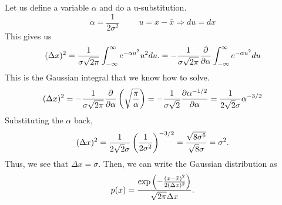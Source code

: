         Let us define a variable $\alpha$ and do a u-substitution.
        \begin{equation}
            \alpha = \frac{1}{2\sigma^2} \hspace{1cm} u=x-\bar{x}\Rightarrow du=dx
        \end{equation}
        This gives us
        \begin{equation}
            (\Delta x)^2 = \frac{1}{\sigma\sqrt{2\pi}}\int_{-\infty}^\infty e^{-\alpha u^2}u^2du. = -\frac{1}{\sigma\sqrt{2\pi}}\frac{\partial }{\partial \alpha}\int_{-\infty}^\infty e^{-\alpha u^2}du
        \end{equation}
        This is the Gaussian integral that we know how to solve. 
        \begin{equation}
            (\Delta x)^2 = -\frac{1}{\sigma\sqrt{2\pi}}\frac{\partial }{\partial \alpha}\left( \sqrt{\frac{\pi}{\alpha}} \right) = -\frac{1}{\sigma\sqrt{2}}\frac{\partial \alpha^{-1/2}}{\partial \alpha} = \frac{1}{2\sqrt{2}\sigma}\alpha^{-3/2}
        \end{equation}
        Substituting the $\alpha$ back,
        \begin{equation}
            (\Delta x)^2 = \frac{1}{2\sqrt{2}\sigma}\left( \frac{1}{2\sigma^2} \right)^{-3/2} = \frac{\sqrt{8\sigma^6}}{\sqrt{8}\sigma} = \sigma^2.
        \end{equation}
        Thus, we see that $\Delta x = \sigma$. Then, we can write the Gaussian distribution as
        \begin{equation}
            p(x) = \frac{\exp\left( -\frac{(x-\bar{x})^2}{2(\Delta x)^2} \right)}{\sqrt{2\pi}\Delta x}.
        \end{equation}
        